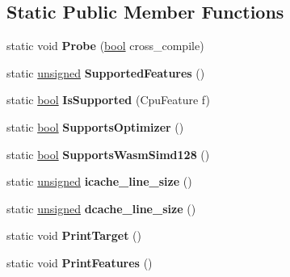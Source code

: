 \subsection*{Static Public Member Functions}
\begin{DoxyCompactItemize}
\item 
\mbox{\label{classv8_1_1internal_1_1CpuFeatures_a81ae78f6f799c911bf55ca0e4099b6aa}} 
static void {\bfseries Probe} (\mbox{\hyperlink{classbool}{bool}} cross\+\_\+compile)
\item 
\mbox{\label{classv8_1_1internal_1_1CpuFeatures_a481a85a8743cc9ef2303e3d9d58d4869}} 
static \mbox{\hyperlink{classunsigned}{unsigned}} {\bfseries Supported\+Features} ()
\item 
\mbox{\label{classv8_1_1internal_1_1CpuFeatures_a44305c4c7840c90b5cf4a0b6ebd791af}} 
static \mbox{\hyperlink{classbool}{bool}} {\bfseries Is\+Supported} (Cpu\+Feature f)
\item 
\mbox{\label{classv8_1_1internal_1_1CpuFeatures_a71ba2dffd690fda8713ca3e9099589a0}} 
static \mbox{\hyperlink{classbool}{bool}} {\bfseries Supports\+Optimizer} ()
\item 
\mbox{\label{classv8_1_1internal_1_1CpuFeatures_a7b36448a7bd94e1f4a8288e0ed6313d5}} 
static \mbox{\hyperlink{classbool}{bool}} {\bfseries Supports\+Wasm\+Simd128} ()
\item 
\mbox{\label{classv8_1_1internal_1_1CpuFeatures_ac676ee97ad12a0fda46389cd57c23844}} 
static \mbox{\hyperlink{classunsigned}{unsigned}} {\bfseries icache\+\_\+line\+\_\+size} ()
\item 
\mbox{\label{classv8_1_1internal_1_1CpuFeatures_ab2552a12f4ef4f13591b303696db29b9}} 
static \mbox{\hyperlink{classunsigned}{unsigned}} {\bfseries dcache\+\_\+line\+\_\+size} ()
\item 
\mbox{\label{classv8_1_1internal_1_1CpuFeatures_a9db700f7f56524d827e19fd44ef7a07e}} 
static void {\bfseries Print\+Target} ()
\item 
\mbox{\label{classv8_1_1internal_1_1CpuFeatures_a9b099faa5af8ce6e4e6d455590c14189}} 
static void {\bfseries Print\+Features} ()
\end{DoxyCompactItemize}
